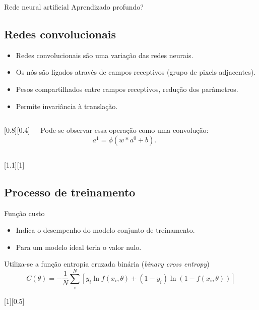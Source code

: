 \begin{frame}{Rede neural artificial}
	\pause
	\vspace{-30pt}
	\center Aprendizado profundo?
\end{frame}

\subsection{Redes convolucionais}
\begin{frame}{\insertsubsection}
	\begin{itemize}
	\item Redes convolucionais são uma variação das redes neurais.
	\item Os nós são ligados através de campos receptivos (grupo de pixels adjacentes).
	\item Pesos compartilhados entre campos receptivos, redução dos parâmetros.
	\item Permite invariância à translação.
	\end{itemize}

	\begin{columns}
		[0.8][0.4]

		Pode-se observar essa operação como uma convolução:
		\begin{equation*}
		a^1 = \phi(w \ast a^0 + b).
		\end{equation*}

	\end{columns}
	
\end{frame}

\begin{frame}{\insertsubsection}
	[1.1][1]
\end{frame}

\subsection{Processo de treinamento}

\begin{frame}{Função custo}
	\begin{itemize}
	\item Indica o desempenho do modelo conjunto de treinamento.
	\item Para um modelo ideal teria o valor nulo.
	\end{itemize}

	\pause

	Utiliza-se a função entropia cruzada binária (\textit{binary cross entropy})
	\begin{equation*}
	C(\theta) = -\frac{1}{N} \sum_i^N \left[y_i \ln f(x_i,\theta) + (1-y_i) \ln (1-f(x_i,\theta))\right]
	\end{equation*}

	[0.5]
\end{frame}

